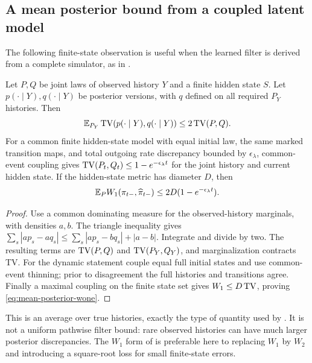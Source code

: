 \subsection{A mean posterior bound from a coupled latent model}\label{sec:posterior-stability}
The following finite-state observation is useful when the learned filter is derived from a complete simulator, as in .

\begin{proposition}\label{prop:filter-stability}
Let $P,Q$ be joint laws of observed history $Y$ and a finite hidden state $S$. Let $p(\cdot\mid Y),q(\cdot\mid Y)$ be posterior versions, with $q$ defined on all required $P_Y$ histories. Then
\begin{equation}\label{eq:mean-posterior-tv}
 \mathbb E_{P_Y}\operatorname{TV}(p(\cdot\mid Y),q(\cdot\mid Y))\le2\operatorname{TV}(P,Q).
\end{equation}
For a common finite hidden-state model with equal initial law, the same marked transition maps, and total outgoing rate discrepancy bounded by $\epsilon_\lambda$, common-event coupling gives
$\operatorname{TV}(P_t,Q_t)\le1-e^{-\epsilon_\lambda t}$ for the joint history and current hidden state. If the hidden-state metric has diameter $D$, then
\begin{equation}\label{eq:mean-posterior-wone}
 \mathbb E_P W_1(\pi_{t-},\widehat\pi_{t-})
 \le2D(1-e^{-\epsilon_\lambda t}).
\end{equation}
\end{proposition}
\begin{proof}
Use a common dominating measure for the observed-history marginals, with densities $a,b$. The triangle inequality gives
$\sum_s|a p_s-a q_s|\le\sum_s|a p_s-b q_s|+|a-b|$.
Integrate and divide by two. The resulting terms are $\operatorname{TV}(P,Q)$ and $\operatorname{TV}(P_Y,Q_Y)$, and marginalization contracts TV. For the dynamic statement couple equal full initial states and use common-event thinning; prior to disagreement the full histories and transitions agree. Finally a maximal coupling on the finite state set gives $W_1\le D\operatorname{TV}$, proving \eqref{eq:mean-posterior-wone}.
\end{proof}

This is an average over true histories, exactly the type of quantity used by . It is not a uniform pathwise filter bound: rare observed histories can have much larger posterior discrepancies. The $W_1$ form of  is preferable here to replacing $W_1$ by $W_2$ and introducing a square-root loss for small finite-state errors.
